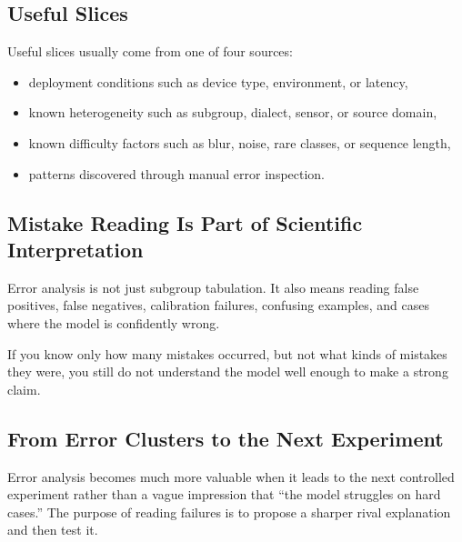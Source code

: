 \subsection{Useful Slices}

Useful slices usually come from one of four sources:
\begin{itemize}[leftmargin=*]
\item deployment conditions such as device type, environment, or latency,
\item known heterogeneity such as subgroup, dialect, sensor, or source domain,
\item known difficulty factors such as blur, noise, rare classes, or sequence length,
\item patterns discovered through manual error inspection.
\end{itemize}

\subsection{Mistake Reading Is Part of Scientific Interpretation}

Error analysis is not just subgroup tabulation. It also means reading false positives, false negatives, calibration failures, confusing examples, and cases where the model is confidently wrong.

\begin{practicalnote}
If you know only how many mistakes occurred, but not what kinds of mistakes they were, you still do not understand the model well enough to make a strong claim.
\end{practicalnote}

\subsection{From Error Clusters to the Next Experiment}

Error analysis becomes much more valuable when it leads to the next controlled experiment rather than a vague impression that ``the model struggles on hard cases.'' The purpose of reading failures is to propose a sharper rival explanation and then test it.

